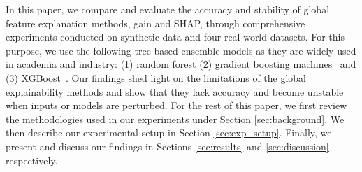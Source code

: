 In this paper, we compare and evaluate the accuracy and stability of global feature explanation methods, gain and SHAP, through comprehensive experiments conducted on synthetic data and four real-world datasets. For this purpose, we use the following tree-based ensemble models as they are widely used in academia and industry: (1) random forest (2) gradient boosting machines~\cite{scikit-learn} and (3) XGBoost~\cite{Chen:2016:XST:2939672.2939785}. Our findings shed light on the limitations of the global explainability methods and show that they lack accuracy and become unstable when inputs or models are perturbed. %
For the rest of this paper, we first review the methodologies used in our experiments under Section \ref{sec:background}. We then describe our experimental setup in Section \ref{sec:exp_setup}. Finally, we present and discuss our findings in Sections \ref{sec:results} and \ref{sec:discussion} respectively.








